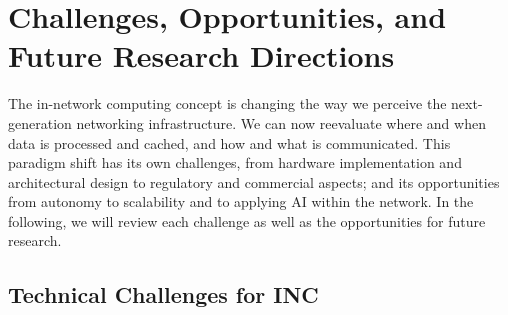 \section{Challenges, Opportunities, and Future Research Directions}\label{Challenges}
\noindent The in-network computing concept is changing the way we perceive the next-generation networking infrastructure. We can now reevaluate where and when data is processed and cached, and how and what is communicated. This paradigm shift has its own challenges, from hardware implementation and architectural design to regulatory and commercial aspects; and its opportunities from autonomy to scalability and to applying AI within the network. In the following, we will review each challenge as well as the opportunities for future research. 

\subsection{Technical Challenges for INC}
\vspace{-3pt}
